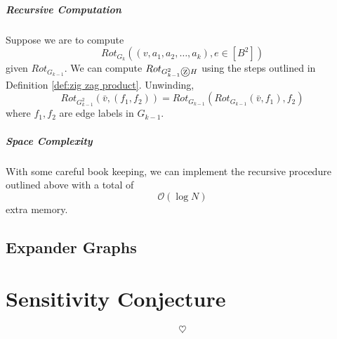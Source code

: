 \documentclass[11pt, letter]{book}
\newcommand*\tcircle[1]{%
  \raisebox{-0.5pt}{%
    \textcircled{#1}%
  }%
}
\begin{document}
\paragraph{Recursive Computation}
Suppose we are to compute 
\begin{equation}
	Rot_{G_k}\left( (v, a_1, a_2, \dots, a_k) , e \in [B^2] \right)
\end{equation}
given $Rot_{G_{k - 1}}$. We can compute $Rot_{G^2_{k - 1} \tcircle {z} H}$ using the steps outlined in Definition \ref{def:zig zag product}. Unwinding, 
\begin{equation}
	Rot_{G^2_{k - 1}} \left( \bar v, ( f_1, f_2 ) \right) = Rot_{G_{k - 1}} \left( Rot_{G_{k - 1}} (\bar v, f_1 ) , f_2 \right)
\end{equation}
where $f_1, f_2$ are edge labels in $G_{k - 1}$. 

\paragraph{Space Complexity}
With some careful book keeping, we can implement the recursive procedure outlined above with a total of 
\begin{equation}
	\mathcal O (\log N )
\end{equation}
extra memory. 


\section{Expander Graphs}



\chapter{Sensitivity Conjecture}






























\vfill 
\begin{equation*}
	\heartsuit
\end{equation*}
\end{document}
